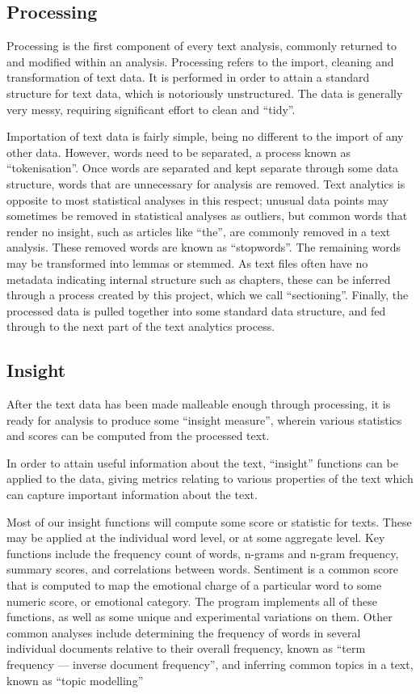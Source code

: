 \documentclass[11pt, a4paper, titlepage]{report}
\begin{document}
\subsection{Processing}\label{sec:processing}

Processing is the first component of every text analysis, commonly
returned to and modified within an analysis. Processing refers to the
import, cleaning and transformation of text data. It is performed in
order to attain a standard structure for text data, which is
notoriously unstructured. The data is generally very messy, requiring
significant effort to clean and ``tidy''.

Importation of text data is fairly simple, being no different to the
import of any other data. However, words need to be separated, a
process known as ``tokenisation''. Once words are separated and kept
separate through some data structure, words that are unnecessary for
analysis are removed. Text analytics is opposite to most statistical
analyses in this respect; unusual data points may sometimes be removed
in statistical analyses as outliers, but common words that render no
insight, such as articles like ``the'', are commonly removed in a text
analysis. These removed words are known as ``stopwords''. The
remaining words may be transformed into lemmas or stemmed. As text
files often have no metadata indicating internal structure such as
chapters, these can be inferred through a process created by this
project, which we call ``sectioning''. Finally, the processed data is
pulled together into some standard data structure, and fed through to
the next part of the text analytics process.

\subsection{Insight}\label{sec:insight-1}

After the text data has been made malleable enough through processing,
it is ready for analysis to produce some ``insight measure'', wherein
various statistics and scores can be computed from the processed text.

In order to attain useful information about the text, ``insight''
functions can be applied to the data, giving metrics relating to
various properties of the text which can capture important information
about the text.

Most of our insight functions will compute some score or statistic for
texts. These may be applied at the individual word level, or at some
aggregate level. Key functions include the frequency count of words,
n-grams and n-gram frequency, summary scores, and correlations between
words. Sentiment is a common score that is computed to map the
emotional charge of a particular word to some numeric score, or
emotional category. The program implements all of these functions, as
well as some unique and experimental variations on them. Other common
analyses include determining the frequency of words in several
individual documents relative to their overall frequency, known as
``term frequency --- inverse document frequency'', and inferring
common topics in a text, known as ``topic modelling''
\end{document}
